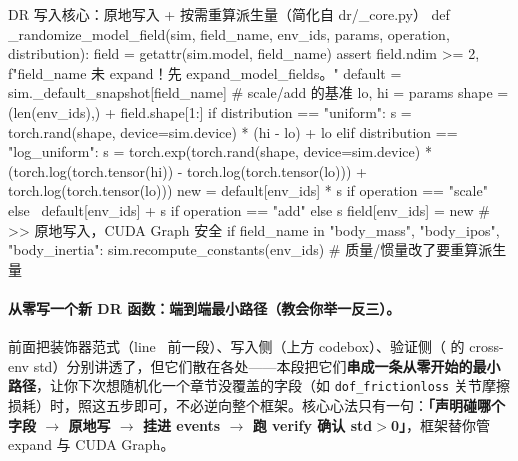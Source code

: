 \begin{codebox}[Python]{DR 写入核心：原地写入 + 按需重算派生量（简化自 dr/\_core.py）}
def _randomize_model_field(sim, field_name, env_ids, params, operation, distribution):
    field = getattr(sim.model, field_name)
    assert field.ndim >= 2, f"{field_name} 未 expand！先 expand_model_fields。"
    default = sim._default_snapshot[field_name]            # scale/add 的基准
    lo, hi = params
    shape = (len(env_ids),) + field.shape[1:]
    if distribution == "uniform":
        s = torch.rand(shape, device=sim.device) * (hi - lo) + lo
    elif distribution == "log_uniform":
        s = torch.exp(torch.rand(shape, device=sim.device)
                      * (torch.log(torch.tensor(hi)) - torch.log(torch.tensor(lo)))
                      + torch.log(torch.tensor(lo)))
    new = default[env_ids] * s if operation == "scale" else \
          default[env_ids] + s if operation == "add" else s
    field[env_ids] = new                                   # >> 原地写入，CUDA Graph 安全
    if field_name in {"body_mass", "body_ipos", "body_inertia"}:
        sim.recompute_constants(env_ids)                   # 质量/惯量改了要重算派生量
\end{codebox}

\paragraph{从零写一个新 DR 函数：端到端最小路径（教会你举一反三）。}前面把装饰器范式（line~\pageref{ins:rlmc-dr-inplace} 前一段）、写入侧（上方 codebox）、验证侧（ 的 cross-env std）分别讲透了，但它们散在各处——本段把它们\textbf{串成一条从零开始的最小路径}，让你下次想随机化一个章节没覆盖的字段（如 \verb|dof_frictionloss| 关节摩擦损耗）时，照这五步即可，不必逆向整个框架。核心心法只有一句：\textbf{「声明碰哪个字段 $\to$ 原地写 $\to$ 挂进 events $\to$ 跑 verify 确认 std$>$0」}，框架替你管 expand 与 CUDA Graph。

